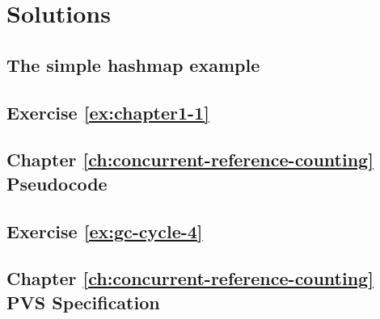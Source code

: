 \chapter{Solutions}

\section{The simple hashmap example}\label{sol:simple-hashmap}



\section{Exercise \ref{ex:chapter1-1}}


\section{Chapter \ref{ch:concurrent-reference-counting} Pseudocode}\label{sec:refcount-full-pseudocode}


\section{Exercise \ref{ex:gc-cycle-4}}

\section{Chapter \ref{ch:concurrent-reference-counting} PVS Specification}\label{sec:refcount-full-pvs-specification}

